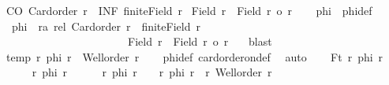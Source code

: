 \begin{isabellebody}
\ CO{\isacharcolon}{\kern0pt}\ {\isachardoublequoteopen}Card{\isacharunderscore}{\kern0pt}order\ r{\isachardoublequoteclose}\ \ INF{\isacharcolon}{\kern0pt}\ {\isachardoublequoteopen}{\isasymnot}finite{\isacharparenleft}{\kern0pt}Field\ r{\isacharparenright}{\kern0pt}{\isachardoublequoteclose}\isanewline
{}\ {\isachardoublequoteopen}{\isacharbar}{\kern0pt}Field\ r\ {\isasymtimes}\ Field\ r{\isacharbar}{\kern0pt}\ {\isasymle}o\ r{\isachardoublequoteclose}\isanewline
%
\isadelimproof
%
\endisadelimproof
%
\isatagproof
{}\isamarkupfalse%
{\isacharminus}{\kern0pt}\isanewline
\ \ \isamarkupfalse%
\ phi\ \ phi{\isacharunderscore}{\kern0pt}def{\isacharcolon}{\kern0pt}\isanewline
\ \ {\isachardoublequoteopen}phi\ {\isacharequal}{\kern0pt}\ {\isacharparenleft}{\kern0pt}{\isasymlambda}r{\isacharcolon}{\kern0pt}{\isacharcolon}{\kern0pt}{\isacharprime}{\kern0pt}a\ rel{\isachardot}{\kern0pt}\ Card{\isacharunderscore}{\kern0pt}order\ r\ {\isasymand}\ {\isasymnot}finite{\isacharparenleft}{\kern0pt}Field\ r{\isacharparenright}{\kern0pt}\ {\isasymand}\isanewline
\ \ \ \ \ \ \ \ \ \ \ \ \ \ \ \ \ \ \ \ \ \ {\isasymnot}\ {\isacharbar}{\kern0pt}Field\ r\ {\isasymtimes}\ Field\ r{\isacharbar}{\kern0pt}\ {\isasymle}o\ r\ {\isacharparenright}{\kern0pt}{\isachardoublequoteclose}\ \isamarkupfalse%
\ blast\isanewline
\ \ \isamarkupfalse%
\ temp{}{\isacharcolon}{\kern0pt}\ {\isachardoublequoteopen}{\isasymforall}r{\isachardot}{\kern0pt}\ phi\ r\ {\isasymlongrightarrow}\ Well{\isacharunderscore}{\kern0pt}order\ r{\isachardoublequoteclose}\isanewline
\ \ \isamarkupfalse%
\ phi{\isacharunderscore}{\kern0pt}def\ card{\isacharunderscore}{\kern0pt}order{\isacharunderscore}{\kern0pt}on{\isacharunderscore}{\kern0pt}def\ \isamarkupfalse%
\ auto\isanewline
\ \ \isamarkupfalse%
\ Ft{\isacharcolon}{\kern0pt}\ {\isachardoublequoteopen}{\isasymnot}{\isacharparenleft}{\kern0pt}{\isasymexists}r{\isachardot}{\kern0pt}\ phi\ r{\isacharparenright}{\kern0pt}{\isachardoublequoteclose}\isanewline
\ \ \isamarkupfalse%
\isanewline
\ \ \ \ \isamarkupfalse%
\ {\isachardoublequoteopen}{\isasymexists}r{\isachardot}{\kern0pt}\ phi\ r{\isachardoublequoteclose}\isanewline
\ \ \ \ \isamarkupfalse%
\ {\isachardoublequoteopen}{\isacharbraceleft}{\kern0pt}r{\isachardot}{\kern0pt}\ phi\ r{\isacharbraceright}{\kern0pt}\ {\isasymnoteq}\ {\isacharbraceleft}{\kern0pt}{\isacharbraceright}{\kern0pt}\ {\isasymand}\ {\isacharbraceleft}{\kern0pt}r{\isachardot}{\kern0pt}\ phi\ r{\isacharbraceright}{\kern0pt}\ {\isasymle}\ {\isacharbraceleft}{\kern0pt}r{\isachardot}{\kern0pt}\ Well{\isacharunderscore}{\kern0pt}order\ r{\isacharbraceright}{\kern0pt}{\isachardoublequoteclose}\isanewline

\end{isabellebody}
